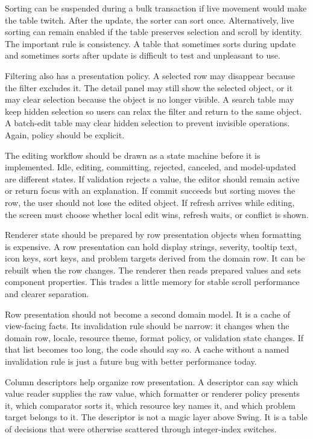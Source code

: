 Sorting can be suspended during a bulk transaction if live movement would make the table twitch. After the update, the sorter can sort once. Alternatively, live sorting can remain enabled if the table preserves selection and scroll by identity. The important rule is consistency. A table that sometimes sorts during update and sometimes sorts after update is difficult to test and unpleasant to use.

Filtering also has a presentation policy. A selected row may disappear because the filter excludes it. The detail panel may still show the selected object, or it may clear selection because the object is no longer visible. A search table may keep hidden selection so users can relax the filter and return to the same object. A batch-edit table may clear hidden selection to prevent invisible operations. Again, policy should be explicit.

The editing workflow should be drawn as a state machine before it is implemented. Idle, editing, committing, rejected, canceled, and model-updated are different states. If validation rejects a value, the editor should remain active or return focus with an explanation. If commit succeeds but sorting moves the row, the user should not lose the edited object. If refresh arrives while editing, the screen must choose whether local edit wins, refresh waits, or conflict is shown.

Renderer state should be prepared by row presentation objects when formatting is expensive. A row presentation can hold display strings, severity, tooltip text, icon keys, sort keys, and problem targets derived from the domain row. It can be rebuilt when the row changes. The renderer then reads prepared values and sets component properties. This trades a little memory for stable scroll performance and clearer separation.

Row presentation should not become a second domain model. It is a cache of view-facing facts. Its invalidation rule should be narrow: it changes when the domain row, locale, resource theme, format policy, or validation state changes. If that list becomes too long, the code should say so. A cache without a named invalidation rule is just a future bug with better performance today.

Column descriptors help organize row presentation. A descriptor can say which value reader supplies the raw value, which formatter or renderer policy presents it, which comparator sorts it, which resource key names it, and which problem target belongs to it. The descriptor is not a magic layer above Swing. It is a table of decisions that were otherwise scattered through integer-index switches.

